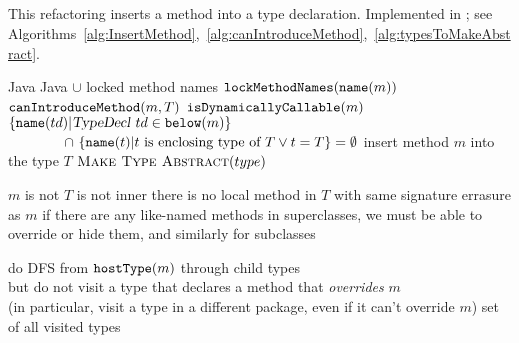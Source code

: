 \subsection{}
This refactoring inserts a method into a type declaration. Implemented in ; see Algorithms~\ref{alg:InsertMethod},~\ref{alg:canIntroduceMethod},~\ref{alg:typesToMakeAbstract}.

\begin{algorithm}[p]
\caption{$\refactoring{Insert Method}(m : \type{Method}, T : \type{Type})$}\label{alg:InsertMethod}
\begin{algorithmic}[1]
\REQUIRE Java
\ENSURE Java $\cup$ locked method names
\medskip
  \STATE $\text{\texttt{lockMethodNames}}(\text{\texttt{name}}(m))$
  \STATE \assert $\text{\texttt{canIntroduceMethod}}(m, T)$
  \STATE \assert \NOT $\text{\texttt{isDynamicallyCallable}}(m)$ 
  \STATE \assert $\{\util{name}(td) | \type{TypeDecl}\ td\in\util{below}(m)\} 
  		$\\$\qquad\qquad\cap\  
		\{\text{\texttt{name}}(t) | t\text{ is enclosing type of }T \vee t = T\} = \emptyset$
  \STATE insert method $m$ into the type $T$
       \STATE $\textsc{Make Type Abstract}(type)$
     \ENDFOR
  \ENDIF
\end{algorithmic}
\end{algorithm}


\begin{algorithm}[p]
\caption{$\util{canIntroduceMethod}(m : \type{Method}, T : \type{Type})$}\label{alg:canIntroduceMethod}
\begin{algorithmic}[1]
  \STATE \assert $m$ is not  \OR $T$ is not inner
  \STATE \assert there is no local method in $T$ with same signature errasure as $m$
  \STATE \assert if there are any like-named methods in superclasses, we must be able to override or hide them, and
  			similarly for subclasses
\end{algorithmic}
\end{algorithm}

\begin{algorithm}[p]
\caption{$\util{typesToMakeAbstract}(m : \type{Method}) : \settp{Type}$}\label{alg:typesToMakeAbstract}
\begin{algorithmic}[1]
  \STATE do DFS from $\text{\texttt{hostType}}(m)$ through child types \\
    but do not visit a type that declares a method that \emph{overrides} $m$ \\
    (in particular, visit a type in a different package, even if it can't override $m$)
  \RETURN set of all visited types
\end{algorithmic}
\end{algorithm}

